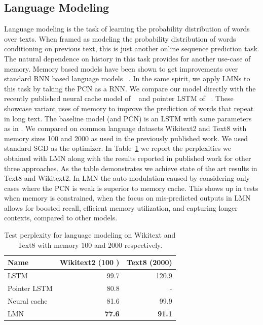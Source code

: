 \documentclass[letterpaper]{article} %
\begin{document}
\subsection{Language Modeling}
Language modeling is the task of learning the probability distribution of words over texts. When framed as modeling the probability distribution of words conditioning on previous text, this is just another online sequence prediction task. The natural dependence on history in this task provides for another use-case of memory. Memory based models have been shown to get improvements over standard RNN based language models ~\cite{SukhbaatarSWF15,merity2016pointer,grave2016improving}.
In the same spirit, we apply LMNs to this task by taking the PCN as a RNN.  We compare our model directly with the recently published neural cache model of ~\cite{grave2016improving} and pointer LSTM of ~\cite{merity2016pointer}. These showcase variant uses of memory to improve the prediction of words that repeat in long text.  The baseline model (and PCN) is an LSTM with same parameters as in \cite{grave2016improving}.
We compared on common language datasets Wikitext2 and Text8 with memory sizes 100 and 2000 as used in the previously published work. We used standard SGD as the optimizer.  In Table~\ref{tab-lm} we report the perplexities we obtained with LMN along with the results reported in published work for other three approaches. As the table demonstrates we achieve state of the art results in Text8 and Wikitext2. In LMN the auto-modulation caused by considering only cases where the PCN is weak is superior to memory cache. This shows up in tests when memory is constrained, when the focus on mis-predicted outputs in LMN allows for boosted recall, efficient memory utilization, and capturing longer contexts, compared to other models.

\begin{table}
\begin{center}
\begin{tabular}{|l|r|r|} \hline
Name &    Wikitext2 (100 ) &  Text8 (2000)\\ \hline
LSTM & 99.7 & 120.9 \\
Pointer LSTM &	80.8	& -\\
Neural cache &  81.6 &  99.9\\
LMN &	\textbf{77.6}	& \textbf{91.1}\\ \hline
\end{tabular}
\end{center}
\caption{ \label{tab-lm} Test perplexity for language modeling on Wikitext and Text8 with memory 100 and 2000 respectively.}
\end{table}
\end{document}
